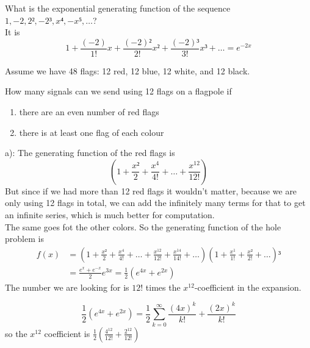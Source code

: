 \documentclass[english]{lbscript}
\begin{document}
\begin{example}{}{}
  What is the exponential generating function of the sequence \(1, -2, 2², -2³,x⁴,-x⁵,\dots\)?\\
  It is
\begin{equation}
\label{eq:46}
1+ \frac{(-2)}{1!}x + \frac{(-2)²}{2!}x² + \frac{(-2)³}{3!}x³+\dots=e^{-2x}
\end{equation}
\end{example}

\begin{example}{}{}
  Assume we have 48 flags: 12 red, 12 blue, 12 white, and 12 black.

  How many signals can we send using 12 flags on a flagpole if
\begin{enumerate}[label=(\alph{*})]
\item\label{item:16} there are an even number of red flags
\item\label{item:17} there is at least one flag of each colour
\end{enumerate}

a): The generating function of the red flags is
\begin{equation}
\label{eq:47}
\left(1+\frac{x²}{2} + \frac{x^{4}}{4!} + \dots + \frac{x^{12}}{12!} \right)
\end{equation}
But since if we had more than 12 red flags it wouldn't matter, because we are only using 12 flags in total, we can add the infinitely many terms for that to get an infinite series, which is much better for computation.\\
The same goes fot the other colors. So the generating function of the hole problem is
\begin{align}
\label{eq:48}
  f(x)
  &= \left(1+\frac{x²}{2} + \frac{x^{4}}{4!} + \dots + \frac{x^{12}}{12!} + \frac{x^{14}}{14!}+\dots \right) \left(1 + \frac{x^{1}}{1!}+\frac{x²}{2!}+\dots \right)³\\
  &= \frac{e^{x}+e^{-x}}{2} e^{3x} = \frac{1}{2}\left(e^{4x}+e^{2x} \right)
\end{align}
The number we are looking for is \(12!\) times the \(x^{12}\)-coefficient in the expansion.

\begin{equation}
\label{eq:49}
\frac{1}{2}(e^{4x}+e^{2x}) = \frac{1}{2} ∑_{k=0}^{∞} \frac{(4x)^{k}}{k!} + \frac{(2x)^{k}}{k!}
\end{equation}
so the \(x^{12}\) coefficient is \(\frac{1}{2}\left( \frac{4^{12}}{12!} + \frac{2^{12}}{12!}\right)\)


\end{example}
\end{document}
